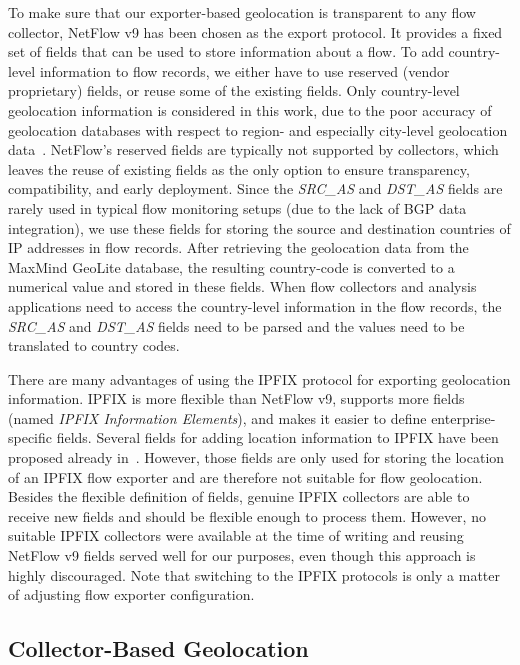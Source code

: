To make sure that our exporter-based geolocation is transparent to any flow collector, NetFlow v9 has been chosen as the export protocol. It provides a fixed set of fields that can be used to store information about a flow. To add country-level information to flow records, we either have to use reserved (vendor proprietary) fields, or reuse some of the existing fields. Only country-level geolocation information is considered in this work, due to the poor accuracy of geolocation databases with respect to region- and especially city-level geolocation data~\cite{Poese-2011-IP}. NetFlow's reserved fields are typically not supported by collectors, which leaves the reuse of existing fields as the only option to ensure transparency, compatibility, and early deployment. Since the \textit{SRC\_AS} and \textit{DST\_AS} fields are rarely used in typical flow monitoring setups (due to the lack of BGP data integration), we use these fields for storing the source and destination countries of IP addresses in flow records. After retrieving the geolocation data from the MaxMind GeoLite database, the resulting country-code is converted to a numerical value and stored in these fields. When flow collectors and analysis applications need to access the country-level information in the flow records, the \textit{SRC\_AS} and \textit{DST\_AS} fields need to be parsed and the values need to be translated to country codes.

There are many advantages of using the IPFIX protocol for exporting geolocation information. IPFIX is more flexible than NetFlow v9, supports more fields (named \textit{IPFIX Information Elements}), and makes it easier to define enterprise-specific fields. Several fields for adding location information to IPFIX have been proposed already in~\cite{draft-irtf-nmrg-location-ipfix-00}. However, those fields are only used for storing the location of an IPFIX flow exporter and are therefore not suitable for flow geolocation. Besides the flexible definition of fields, genuine IPFIX collectors are able to receive new fields and should be flexible enough to process them. However, no suitable IPFIX collectors were available at the time of writing and reusing NetFlow v9 fields served well for our purposes, even though this approach is highly discouraged. Note that switching to the IPFIX protocols is only a matter of adjusting flow exporter configuration.

\subsection{Collector-Based Geolocation} \label{subsec:geo-collector_based_geolocation}

